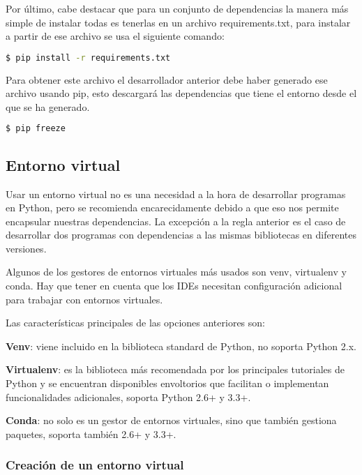 Por último, cabe destacar que para un conjunto de dependencias la manera más simple de instalar todas es tenerlas en un archivo requirements.txt, para instalar a partir de ese archivo se usa el siguiente comando:

\begin{lstlisting}[language=bash]
    $ pip install -r requirements.txt
\end{lstlisting}

Para obtener este archivo el desarrollador anterior debe haber generado ese archivo usando pip, esto descargará las dependencias que tiene el entorno desde el que se ha generado.

\begin{lstlisting}[language=bash]
    $ pip freeze
\end{lstlisting}



\subsection{Entorno virtual}

Usar un entorno virtual no es una necesidad a la hora de desarrollar programas en Python, pero se recomienda encarecidamente debido a que eso nos permite encapsular nuestras dependencias. La excepción a la regla anterior es el caso de desarrollar dos programas con dependencias a las mismas bibliotecas en diferentes versiones.

Algunos de los gestores de entornos virtuales más usados son venv, virtualenv y conda. Hay que tener en cuenta que los IDEs necesitan configuración adicional para trabajar con entornos virtuales. 

Las características principales de las opciones anteriores son:

\begin{list}{-}{}
\item \textbf{Venv}: viene incluido en la biblioteca standard de Python, no soporta Python 2.x.
\item \textbf{Virtualenv}: es la biblioteca más recomendada por los principales tutoriales de Python y se encuentran disponibles envoltorios que facilitan o implementan funcionalidades adicionales, soporta Python 2.6+ y 3.3+.
\item \textbf{Conda}: no solo es un gestor de entornos virtuales, sino que también gestiona paquetes, soporta también 2.6+ y 3.3+.
\end{list}

\subsubsection{Creación de un entorno virtual}

